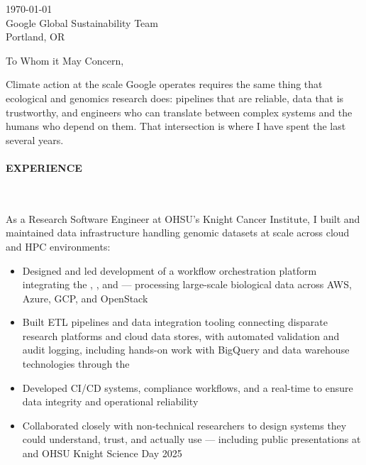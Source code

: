 



\textcolor{my-grey}{\dotfill}
\bigbreak

{\today}\\
Google Global Sustainability Team\\
Portland, OR

\vspace*{2\baselineskip}

To Whom it May Concern,

\vspace*{\baselineskip}

Climate action at the scale Google operates requires the same thing that ecological and genomics research does: pipelines that are reliable, data that is trustworthy, and engineers who can translate between complex systems and the humans who depend on them. That intersection is where I have spent the last several years.

\paragraph{EXPERIENCE}\

\vspace*{\baselineskip}

As a Research Software Engineer at OHSU's Knight Cancer Institute, I built and maintained data infrastructure handling genomic datasets at scale across cloud and HPC environments:

\begin{itemize}

    \item Designed and led development of a workflow orchestration platform integrating the , , and  --- processing large-scale biological data across AWS, Azure, GCP, and OpenStack

    \item Built ETL pipelines and data integration tooling connecting disparate research platforms and cloud data stores, with automated validation and audit logging, including hands-on work with BigQuery and data warehouse technologies through the 

    \item Developed CI/CD systems, compliance workflows, and a real-time  to ensure data integrity and operational reliability

    \item Collaborated closely with non-technical researchers to design systems they could understand, trust, and actually use --- including public presentations at  and OHSU Knight Science Day 2025

\end{itemize}

